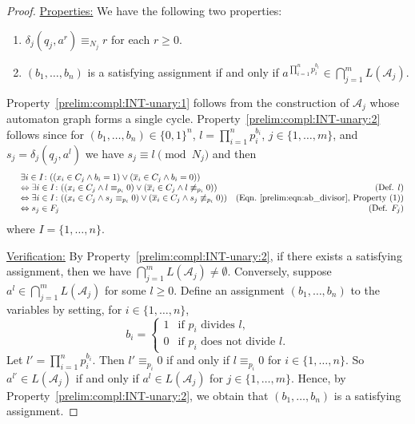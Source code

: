 \begin{proof}
	\medskip
	\noindent\underline{Properties:} We have the following two properties:
	\begin{enumerate}
		\item \label{prelim:compl:INT-unary:1} $\delta_j(q_j, a^r) \equiv_{N_j} r$ for each $r \ge 0$.
		
		\item \label{prelim:compl:INT-unary:2} $(b_1, \ldots, b_n)$ is a satisfying assignment
		if and only if $a^{\prod_{i=1}^n p_i^{b_i}} \in \bigcap_{j=1}^m L(\mathcal A_j)$.
	\end{enumerate}	
	Property~\ref{prelim:compl:INT-unary:1} follows 
	from the construction of $\mathcal A_j$ whose automaton graph forms a single cycle.	
	Property~\ref{prelim:compl:INT-unary:2} follows since for $(b_1, \ldots, b_n) \in \{0,1\}^n$,
	$l = \prod_{i=1}^n p_i^{b_i}$,  $j \in \{1,\ldots,m\}$,
	and $s_j = \delta_j(q_j, a^l)$ we have $s_j \equiv l \pmod{N_j}$ and then
	\[
	\begin{array}{rlr}
		&\exists i \in I \colon ( ( x_i \in C_j \land b_i = 1 ) \lor ( \overline{x}_i \in C_j \land b_i = 0 ) ) \\
		& \Leftrightarrow \exists i \in I \colon ( ( x_i \in C_j \land l \equiv_{p_i} 0 ) \lor ( \overline{x}_i \in C_j \land l \not\equiv_{p_i} 0  ) )  & \text{(Def. $l$)} \\
		& \Leftrightarrow  \exists i \in I \colon( ( x_i \in C_j \land s_j \equiv_{p_i} 0 ) \lor ( \overline{x}_i \in C_j \land s_j \not\equiv_{p_i} 0 ) ) & \text{(Eqn.~\eqref{prelim:eqn:ab_divisor}, Property~(1))} \\
		& \Leftrightarrow  s_j \in F_j & \text{(Def. $F_j$)}
	\end{array}
	\]
	where $I = \{1,\ldots,n\}$.
	
	\medskip 
	\noindent\underline{Verification:} By Property~\ref{prelim:compl:INT-unary:2},
	if there exists a satisfying assignment, then we have $\bigcap_{j=1}^m L(\mathcal A_j) \ne \emptyset$.
	Conversely, suppose $a^l \in \bigcap_{j=1}^m L(\mathcal A_j)$
	for some $l \ge 0$. Define an assignment $(b_1, \ldots, b_n)$
	to the variables by setting, for $i \in \{1,\ldots,n\}$,
	\[
	b_i = \begin{cases}
		1 & \text{if } p_i \text{ divides } l, \\ 
		0 & \text{if } p_i \text{ does not divide } l. 
	\end{cases}	
	\] 	
	Let $l' = \prod_{i=1}^n p_i^{b_i}$.
	Then $l' \equiv_{p_i} 0$ if and only if $l \equiv_{p_i} 0$ for $i \in \{1,\ldots,n\}$.
	So $a^{l'} \in L(\mathcal A_j)$ if and only if $a^l \in L(\mathcal A_j)$ for $j \in \{1,\ldots,m\}$.
	Hence, by Property~\ref{prelim:compl:INT-unary:2}, we obtain that $(b_1, \ldots, b_n)$
	is a satisfying assignment.
\end{proof}

